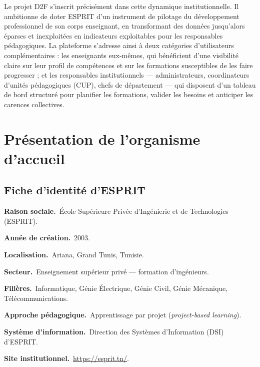 \documentclass[12pt,a4paper]{report}
\begin{document}
Le projet D2F s'inscrit précisément dans cette dynamique institutionnelle. Il
ambitionne de doter ESPRIT d'un instrument de pilotage du développement
professionnel de son corps enseignant, en transformant des données jusqu'alors
éparses et inexploitées en indicateurs exploitables pour les responsables
pédagogiques. La plateforme s'adresse ainsi à deux catégories d'utilisateurs
complémentaires : les enseignants eux-mêmes, qui bénéficient d'une visibilité
claire sur leur profil de compétences et sur les formations susceptibles de les
faire progresser ; et les responsables institutionnels — administrateurs,
coordinateurs d'unités pédagogiques (CUP), chefs de département — qui disposent
d'un tableau de bord structuré pour planifier les formations, valider les
besoins et anticiper les carences collectives.

\section{Présentation de l'organisme d'accueil}

\subsection{Fiche d'identité d'ESPRIT}

\noindent\textbf{Raison sociale.}~École Supérieure Privée d'Ingénierie et de
Technologies (ESPRIT).\par\smallskip
\noindent\textbf{Année de création.}~2003.\par\smallskip
\noindent\textbf{Localisation.}~Ariana, Grand Tunis, Tunisie.\par\smallskip
\noindent\textbf{Secteur.}~Enseignement supérieur privé — formation d'ingénieurs.\par\smallskip
\noindent\textbf{Filières.}~Informatique, Génie Électrique, Génie Civil,
Génie Mécanique, Télécommunications.\par\smallskip
\noindent\textbf{Approche pédagogique.}~Apprentissage par projet
(\textit{project-based learning}).\par\smallskip
\noindent\textbf{Système d'information.}~Direction des Systèmes d'Information
(DSI) d'ESPRIT.\par\smallskip
\noindent\textbf{Site institutionnel.}~\url{https://esprit.tn/}.
\end{document}
